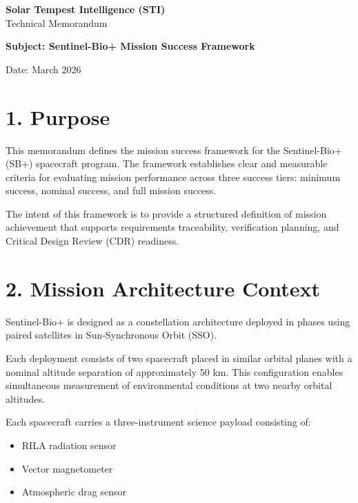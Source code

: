 \documentclass[11pt]{article}
\begin{document}
\begin{center}

{\Large \textbf{Solar Tempest Intelligence (STI)}}\\
\vspace{0.2cm}
{\large Technical Memorandum}

\vspace{0.5cm}

\textbf{Subject: Sentinel-Bio+ Mission Success Framework}

\vspace{0.3cm}

Date: March 2026

\end{center}

\vspace{0.5cm}

\section*{1. Purpose}

This memorandum defines the mission success framework for the Sentinel-Bio+ (SB+) spacecraft program. The framework establishes clear and measurable criteria for evaluating mission performance across three success tiers: minimum success, nominal success, and full mission success.

The intent of this framework is to provide a structured definition of mission achievement that supports requirements traceability, verification planning, and Critical Design Review (CDR) readiness.

\section*{2. Mission Architecture Context}

Sentinel-Bio+ is designed as a constellation architecture deployed in phases using paired satellites in Sun-Synchronous Orbit (SSO).

Each deployment consists of two spacecraft placed in similar orbital planes with a nominal altitude separation of approximately 50 km. This configuration enables simultaneous measurement of environmental conditions at two nearby orbital altitudes.

Each spacecraft carries a three-instrument science payload consisting of:

\begin{itemize}

\item RILA radiation sensor

\item Vector magnetometer

\item Atmospheric drag sensor

\end{itemize}
\end{document}
